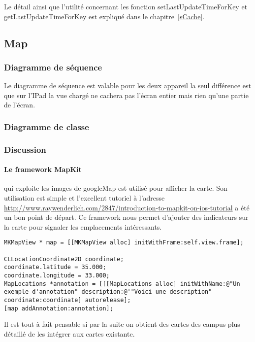 		Le détail ainsi que l'utilité concernant les fonction setLastUpdateTimeForKey et getLastUpdateTimeForKey est expliqué dans le chapitre~\ref{sCache}.

		
	\subsection{Map}
		\subsubsection*{Diagramme de séquence}
			Le diagramme de séquence est valable pour les deux appareil la seul différence est que sur l'IPad la vue chargé  ne cachera pas l'écran entier mais rien qu'une partie de l'écran.
		\subsubsection*{Diagramme de classe}
		\subsubsection*{Discussion}
		\paragraph{Le framework MapKit }
		qui exploite les images de googleMap est utilisé pour afficher la carte. Son utilisation est simple et l'excellent tutoriel à l'adresse \url{http://www.raywenderlich.com/2847/introduction-to-mapkit-on-ios-tutorial} a été un bon point de départ. Ce framework nous permet d'ajouter des indicateurs sur la carte pour signaler les emplacements intéressants. 


			\lstset{
			    style = Xcode,
			    caption=Code de création d'un objet MKMapView et l'ajout d'une annotation.,
			    breaklines=true,
			    frame=single
			}

\begin{lstlisting}[name=MapView with label  , label=MKMapView]
MKMapView * map = [[MKMapView alloc] initWithFrame:self.view.frame];

CLLocationCoordinate2D coordinate;
coordinate.latitude = 35.000;
coordinate.longitude = 33.000;            
MapLocations *annotation = [[[MapLocations alloc] initWithName:@"Un exemple d'annotation" description:@'"Voici une description" coordinate:coordinate] autorelease];
[map addAnnotation:annotation];
\end{lstlisting}
		Il est tout à fait pensable si par la suite on obtient des cartes des campus plus détaillé de les intégrer aux cartes existante. 
		

